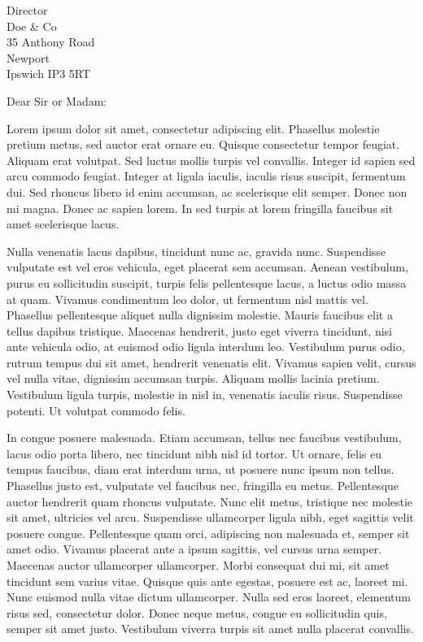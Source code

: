 \documentclass{letter}
\begin{document}
\begin{letter}{Director \\ Doe \& Co \\ 35 Anthony Road
\\ Newport \\ Ipswich IP3 5RT}
\opening{Dear Sir or Madam:}
Lorem ipsum dolor sit amet, consectetur adipiscing elit. Phasellus molestie pretium metus, sed auctor erat ornare eu. Quisque consectetur tempor feugiat. Aliquam erat volutpat. Sed luctus mollis turpis vel convallis. Integer id sapien sed arcu commodo feugiat. Integer at ligula iaculis, iaculis risus suscipit, fermentum dui. Sed rhoncus libero id enim accumsan, ac scelerisque elit semper. Donec non mi magna. Donec ac sapien lorem. In sed turpis at lorem fringilla faucibus sit amet scelerisque lacus. 

 Nulla venenatis lacus dapibus, tincidunt nunc ac, gravida nunc. Suspendisse vulputate est vel eros vehicula, eget placerat sem accumsan. Aenean vestibulum, purus eu sollicitudin suscipit, turpis felis pellentesque lacus, a luctus odio massa at quam. Vivamus condimentum leo dolor, ut fermentum nisl mattis vel. Phasellus pellentesque aliquet nulla dignissim molestie. Mauris faucibus elit a tellus dapibus tristique. Maecenas hendrerit, justo eget viverra tincidunt, nisi ante vehicula odio, at euismod odio ligula interdum leo. Vestibulum purus odio, rutrum tempus dui sit amet, hendrerit venenatis elit. Vivamus sapien velit, cursus vel nulla vitae, dignissim accumsan turpis. Aliquam mollis lacinia pretium. Vestibulum ligula turpis, molestie in nisl in, venenatis iaculis risus. Suspendisse potenti. Ut volutpat commodo felis. 

 In congue posuere malesuada. Etiam accumsan, tellus nec faucibus vestibulum, lacus odio porta libero, nec tincidunt nibh nisl id tortor. Ut ornare, felis eu tempus faucibus, diam erat interdum urna, ut posuere nunc ipsum non tellus. Phasellus justo est, vulputate vel faucibus nec, fringilla eu metus. Pellentesque auctor hendrerit quam rhoncus vulputate. Nunc elit metus, tristique nec molestie sit amet, ultricies vel arcu. Suspendisse ullamcorper ligula nibh, eget sagittis velit posuere congue. Pellentesque quam orci, adipiscing non malesuada et, semper sit amet odio. Vivamus placerat ante a ipsum sagittis, vel cursus urna semper. Maecenas auctor ullamcorper ullamcorper. Morbi consequat dui mi, sit amet tincidunt sem varius vitae. Quisque quis ante egestas, posuere est ac, laoreet mi. Nunc euismod nulla vitae dictum ullamcorper. Nulla sed eros laoreet, elementum risus sed, consectetur dolor. Donec neque metus, congue eu sollicitudin quis, semper sit amet justo. Vestibulum viverra turpis sit amet nulla placerat convallis. 


\end{letter}
\end{document}

